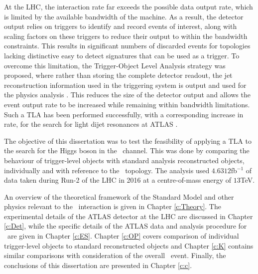 At the LHC, the interaction rate far exceeds the possible data output rate, which is limited by the available bandwidth of the machine. As a result, the detector output relies on triggers to identify and record events of interest, along with scaling factors on these triggers to reduce their output to within the bandwidth constraints. This results in significant numbers of discarded events for topologies lacking distinctive easy to detect signatures that can be used as a trigger. To overcome this limitation, the Trigger-Object Level Analysis strategy was proposed, where rather than storing the complete detector readout, the jet reconstruction information used in the triggering system is output and used for the physics analysis \cite{tla}. This reduces the size of the detector output and allows the event output rate to be increased while remaining within bandwidth limitations. Such a TLA has been performed successfully, with a corresponding increase in rate, for the search for light dijet resonances at ATLAS \cite{tla}.

The objective of this dissertation was to test the feasibility of applying a TLA to the search for the Higgs boson in the \VBFHBB\ channel. This was done by comparing the behaviour of trigger-level objects with standard analysis reconstructed objects, individually and with reference to the \VBFHBB\ topology. The analysis used $4.6312$fb$^{-1}$ of data taken during Run-2 of the LHC in 2016 at a centre-of-mass energy of $13$TeV.

An overview of the theoretical framework of the Standard Model and other physics relevant to the \VBFHBB\ interaction is given in Chapter \ref{c:Theory}. The experimental details of the ATLAS detector at the LHC are discussed in Chapter \ref{c:Det}, while the specific details of the ATLAS data and analysis procedure for \VBFHBB\ are given in Chapter \ref{c:ES}. Chapter \ref{c:OP} covers comparison of individual trigger-level objects to standard reconstructed objects and Chapter \ref{c:K} contains similar comparisons with consideration of the overall \VBFHBB\ event. Finally, the conclusions of this dissertation are presented in Chapter \ref{c:c}.


